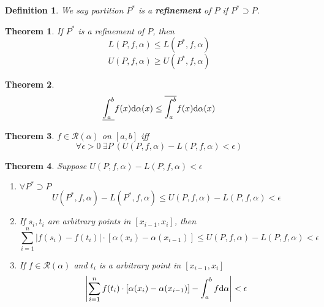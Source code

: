 \documentclass[aps,pra,onecolumn,notitlepage,superscriptaddress]{revtex4-1}
\def\d{{\rm d}}
\newtheorem{theo}{Theorem}
\newtheorem{defi}{Definition}
\begin{document}
    \begin{defi}
        We say partition $P^*$ is a \textbf{refinement} of $P$ if $P^* \supset P$.
    \end{defi}

    \begin{theo}
        If $P^*$ is a refinement of $P$, then
        \begin{equation}
            L(P,f,\alpha) \leq L(P^*, f, \alpha)
        \end{equation}
        \begin{equation}
            U(P,f,\alpha) \geq U(P^*, f, \alpha)
        \end{equation}
    \end{theo}

    \begin{theo}
        \begin{equation}
            \underline{\int_a^b} f(x) \d \alpha(x) \leq \overline{\int_a^b} f(x) \d \alpha(x)
        \end{equation}
    \end{theo}

    \begin{theo}
        $f \in \mathscr{R}(\alpha)$ on $[a,b]$ iff
        \begin{equation}
            \forall \epsilon > 0 \ \exists P \ \left( U(P,f,\alpha)-L(P,f,\alpha) < \epsilon \right)
        \end{equation}
    \end{theo}

    \begin{theo}
        Suppose $U(P,f,\alpha)-L(P,f,\alpha) < \epsilon$
        \begin{enumerate}
            \item $\forall P^* \supset P$
            \begin{equation}
                U(P^*,f,\alpha)-L(P^*,f,\alpha) \leq U(P,f,\alpha)-L(P,f,\alpha) < \epsilon
            \end{equation}

            \item If $s_i, t_i$ are arbitrary points in $[x_{i-1}, x_i]$, then
            \begin{equation}
                \sum_{i=1}^n | f(s_i)-f(t_i) | \cdot [\alpha(x_i)-\alpha(x_{i-1})] \leq U(P,f,\alpha)-L(P,f,\alpha) < \epsilon
            \end{equation}

            \item If $f \in \mathscr{R}(\alpha)$ and $t_i$ is a arbitrary point in $[x_{i-1}, x_i]$
            \begin{equation}
                \left| \sum_{i=1}^n f(t_i) \cdot [\alpha(x_i)-\alpha(x_{i-1})] - \int_a^b f \d \alpha \right| < \epsilon
            \end{equation}
        \end{enumerate}
    \end{theo}
\end{document}
